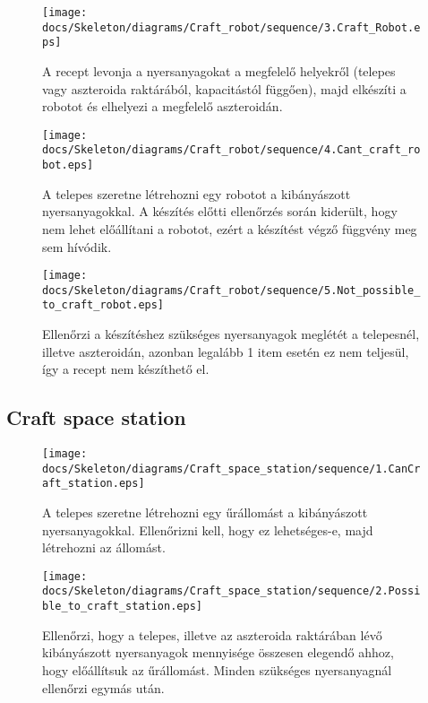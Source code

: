 \begin{figure}[H] 
    \centering 
    \texttt{[image: docs/Skeleton/diagrams/Craft\_robot/sequence/3.Craft\_Robot.eps]} 
    \caption{A recept levonja a nyersanyagokat a megfelelő helyekről (telepes vagy aszteroida raktárából, kapacitástól függően), majd elkészíti a robotot és elhelyezi a megfelelő aszteroidán.} 
\end{figure} 

\begin{figure}[H] 
    \centering 
    \texttt{[image: docs/Skeleton/diagrams/Craft\_robot/sequence/4.Cant\_craft\_robot.eps]} 
    \caption{A telepes szeretne létrehozni egy robotot a kibányászott nyersanyagokkal. A készítés előtti ellenőrzés során kiderült, hogy nem lehet előállítani a robotot, ezért a készítést végző függvény meg sem hívódik. } 
\end{figure} 

\begin{figure}[H] 
    \centering 
    \texttt{[image: docs/Skeleton/diagrams/Craft\_robot/sequence/5.Not\_possible\_to\_craft\_robot.eps]} 
    \caption{Ellenőrzi a készítéshez szükséges nyersanyagok meglétét a telepesnél, illetve aszteroidán, azonban legalább 1 item esetén ez nem teljesül, így a recept nem készíthető el. } 
\end{figure} 

\subsection{Craft space station}

\begin{figure}[H] 
    \centering 
    \texttt{[image: docs/Skeleton/diagrams/Craft\_space\_station/sequence/1.CanCraft\_station.eps]} 
    \caption{ A telepes szeretne létrehozni egy űrállomást a kibányászott nyersanyagokkal. Ellenőrizni kell, hogy ez lehetséges-e, majd létrehozni az állomást. } 
\end{figure} 

\begin{figure}[H] 
    \centering 
    \texttt{[image: docs/Skeleton/diagrams/Craft\_space\_station/sequence/2.Possible\_to\_craft\_station.eps]} 
    \caption{ Ellenőrzi, hogy a telepes, illetve az aszteroida raktárában lévő kibányászott nyersanyagok mennyisége összesen elegendő ahhoz, hogy előállítsuk az űrállomást. Minden szükséges nyersanyagnál ellenőrzi egymás után. } 
\end{figure} 


